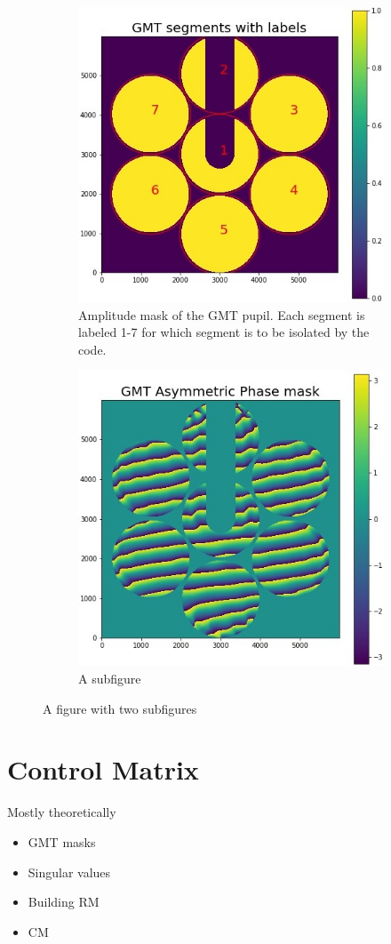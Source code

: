 \begin{figure}[H]
\centering
\begin{subfigure}{.5\textwidth}
  \centering
  \includegraphics[width=10cm]{Figures/GMT_seg_choice.jpg}
  \caption{Amplitude mask of the GMT pupil.  Each segment is labeled 1-7 for which segment is to be isolated by the code.}
  \label{fig:sub1}
\end{subfigure}%
\begin{subfigure}{.5\textwidth}
  \centering
  \includegraphics[width=12cm]{Figures/gmt_phase_mask.jpg}
  \caption{A subfigure}
  \label{fig:sub2}
\end{subfigure}
\caption{A figure with two subfigures}
\label{fig:test}
\end{figure}


\section{Control Matrix}



Mostly theoretically

\begin{itemize}
    \item GMT masks
    \item Singular values
    \item Building RM
    \item CM
\end{itemize}